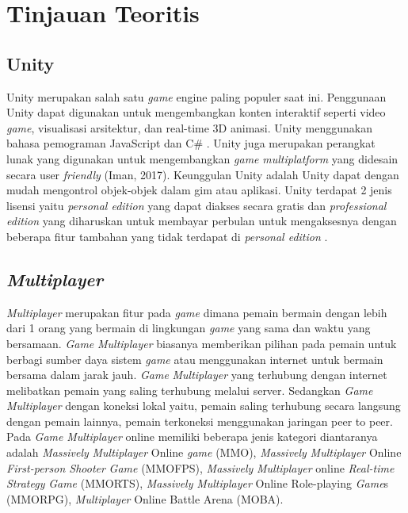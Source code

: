 \section{Tinjauan Teoritis}
\subsection{Unity}
\noindent

Unity merupakan salah satu \textit{game} engine paling populer saat ini. Penggunaan Unity dapat digunakan untuk mengembangkan konten interaktif seperti video \textit{game}, 
visualisasi arsitektur, dan real-time 3D animasi. Unity menggunakan bahasa pemograman JavaScript dan 
C\# \cite{Ansori}. Unity juga merupakan perangkat lunak yang digunakan untuk mengembangkan \textit{game} \textit{multiplatform} yang didesain secara user \textit{friendly} 
(Iman, 2017). Keunggulan Unity adalah Unity 
dapat dengan mudah mengontrol objek-objek 
dalam gim atau aplikasi. Unity terdapat 2 jenis 
lisensi yaitu \textit{personal edition} yang dapat diakses 
secara gratis dan \textit{professional edition} yang 
diharuskan untuk membayar perbulan untuk 
mengaksesnya dengan beberapa fitur tambahan 
yang tidak terdapat di \textit{personal edition} \cite{Sarwodi}. 

\subsection{\textit{Multiplayer}}
\noindent

\textit{Multiplayer} merupakan fitur pada \textit{game} dimana pemain bermain dengan lebih dari 1 orang yang bermain 
di lingkungan \textit{game} yang sama dan waktu yang bersamaan. \textit{Game} \textit{Multiplayer} biasanya memberikan pilihan pada 
pemain untuk berbagi sumber daya sistem \textit{game} atau menggunakan internet untuk bermain bersama dalam jarak 
jauh. \textit{Game} \textit{Multiplayer} yang terhubung dengan internet melibatkan pemain yang saling terhubung melalui server. 
Sedangkan \textit{Game} \textit{Multiplayer} dengan koneksi lokal yaitu, pemain saling terhubung secara langsung dengan 
pemain lainnya, pemain terkoneksi menggunakan jaringan peer to peer. Pada \textit{Game} \textit{Multiplayer} online memiliki 
beberapa jenis kategori diantaranya adalah \textit{Massively} \textit{Multiplayer} Online \textit{game} (MMO), \textit{Massively} \textit{Multiplayer} 
Online \textit{First-person Shooter} \textit{Game} (MMOFPS), \textit{Massively} \textit{Multiplayer} online \textit{Real-time Strategy} \textit{Game}
(MMORTS), \textit{Massively} \textit{Multiplayer} Online Role-playing \textit{Game}s (MMORPG), \textit{Multiplayer} Online Battle Arena
(MOBA)\cite{Ansori}.

